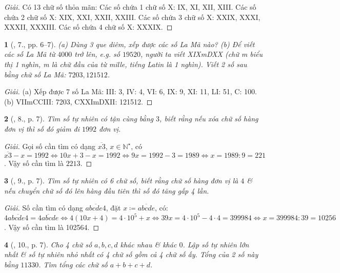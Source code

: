 \documentclass{article}
\newtheorem{baitoan}{}
\begin{document}
\begin{proof}[Giải]
	Có 13 chữ số thỏa mãn: Các số chứa 1 chữ số X: IX, XI, XII, XIII. Các số chứa 2 chữ số X: XIX, XXI, XXII, XXIII. Các số chứa 3 chữ số X: XXIX, XXXI, XXXII, XXXIII. Các số chứa 4 chữ số X: XXXIX.
\end{proof}

\begin{baitoan}[\cite{Binh_Toan_6_tap_1}, 7., pp. 6--7]
	(a) Dùng 3 que diêm, xếp được các số La Mã nào? (b) Để viết các số La Mã từ $4000$ trở lên, e.g. số $19520$, người ta viết {\rm XIXmDXX} (chữ {\rm m} biểu thị \emph{1 nghìn}, m là chữ đầu của từ \emph{mille}, tiếng Latin là 1 nghìn). Viết 2 số sau bằng chữ số La Mã: $7203, 121512$.
\end{baitoan}

\begin{proof}[Giải]
	(a) Xếp được 7 số La Mã: III: 3, IV: 4, VI: 6, IX: 9, XI: 11, LI: 51, C: 100. (b) VIImCCIII: 7203, CXXImDXII: 121512.
\end{proof}

\begin{baitoan}[\cite{Binh_Toan_6_tap_1}, 8., p. 7]
	Tìm số tự nhiên có tận cùng bằng $3$, biết rằng nếu xóa chữ số hàng đơn vị thì số đó giảm đi $1992$ đơn vị.
\end{baitoan}

\begin{proof}[Giải]
	Gọi số cần tìm có dạng $\overline{x3}$, $x\in\mathbb{N}^\star$, có $\overline{x3} - x = 1992\Leftrightarrow10x + 3 - x = 1992\Leftrightarrow9x = 1992 - 3 = 1989\Leftrightarrow x = 1989:9 = 221$. Vậy số cần tìm là $2213$.
\end{proof}

\begin{baitoan}[\cite{Binh_Toan_6_tap_1}, 9., p. 7]
	Tìm số tự nhiên có 6 chữ số, biết rằng chữ số hàng đơn vị là $4$ \& nếu chuyển chữ số đó lên hàng đầu tiên thì số đó tăng gấp 4 lần.
\end{baitoan}

\begin{proof}[Giải]
	Số cần tìm có dạng $\overline{abcde4}$, đặt $x\coloneqq\overline{abcde}$, có: $4\overline{abcde4} = \overline{4abcde}\Leftrightarrow4(10x + 4) = 4\cdot10^5 + x\Leftrightarrow39x = 4\cdot10^5 - 4\cdot4 = 399984\Leftrightarrow x = 399984:39 = 10256$. Vậy số cần tìm là 102564.
\end{proof}

\begin{baitoan}[\cite{Binh_Toan_6_tap_1}, 10., p. 7]
	Cho 4 chữ số $a,b,c,d$ khác nhau \& khác $0$. Lập số tự nhiên lớn nhất \& số tự nhiên nhỏ nhất có 4 chữ số gồm cả 4 chữ số ấy. Tổng của 2 số này bằng $11330$. Tìm tổng các chữ số $a + b + c + d$.
\end{baitoan}
\end{document}
